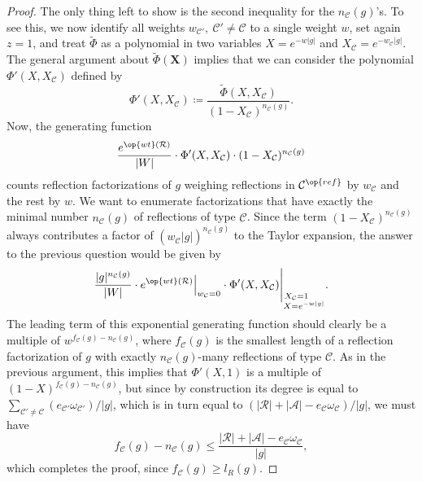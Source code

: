 \begin{proof}
The only thing left to show is the second inequality for the $n_{\mathcal{C}}(g)$'s. To see this, we now identify all weights $w_{\mathcal{C}'},\ \mathcal{C}'\neq\mathcal{C}$ to a single weight $w$, set again $z=1$, and treat $\tilde{\Phi}$ as a polynomial in two variables $X=e^{-w|g|}$ and $X_{\mathcal{C}}=e^{-w^{\phantom{l}}_{\mathcal{C}}|g|}$. The general argument about $\tilde{\Phi}(\bm X)$ implies that we can consider the polynomial $\Phi'(X,X_{\mathcal{C}})$ defined by $$\Phi'(X,X_{\mathcal{C}})\coloneqq \dfrac{\tilde{\Phi}(X,X_{\mathcal{C}})}{(1-X_{\mathcal{C}})^{n_{\mathcal{C}}(g)}}.$$
Now, the generating function $$\dfrac{e^{\op{wt}(\mathcal{R})}}{|W|}\cdot\Phi'(X,X_{\mathcal{C}})\cdot(1-X_{\mathcal{C}})^{n_{\mathcal{C}}(g)}$$ counts 
reflection factorizations of $g$ weighing reflections in $\mathcal{C}^{\op{ref}}$ by $w_{\mathcal{C}}$ and the rest by $w$. 
We want to enumerate factorizations that have exactly the minimal number $n_{\mathcal{C}}(g)$ of reflections of type $\mathcal{C}$. 
Since the term $(1-X_{\mathcal{C}})^{n_{\mathcal{C}}(g)}$ always contributes a factor of $(w^{\phantom{l}}_{\mathcal{C}}|g|)^{n_{\mathcal{C}}(g)}$ to the Taylor expansion, the answer to the previous question would be given by $$\dfrac{|g|^{n_{\mathcal{C}}(g)}}{|W|}\cdot e^{\op{wt}(\mathcal{R})}\Big|_{w_{\mathcal{C}}=0}\cdot\Phi'(X,X_{\mathcal{C}})\Bigg|_{\substack{X_{\mathcal{C}}=1\quad\ \\ X=e^{-w|g|}} }.$$
The leading term of this exponential generating function should clearly be a multiple of $w^{f_{\mathcal{C}}(g)-n_{\mathcal{C}}(g)}$, where $f_{\mathcal{C}}(g)$ is the smallest length of a reflection factorization of $g$ with exactly $n_{\mathcal{C}}(g)$-many reflections of type $\mathcal{C}$. As in the previous argument, this implies that $\Phi'(X,1)$ is a multiple of $(1-X)^{f_{\mathcal{C}}(g)-n_{\mathcal{C}}(g)}$, but since by construction its degree is equal to $\sum_{\mathcal{C}'\neq\mathcal{C}}(e_{\mathcal{C}'}\omega_{\mathcal{C}'})/|g|$, which is in turn equal to $\left(|\mathcal{R}|+|\mathcal{A}|-e_{\mathcal{C}}\omega_{\mathcal{C}}\right)/|g|$, we must have 
\[
f_{\mathcal{C}}(g)-n_{\mathcal{C}}(g)\leq \dfrac{|\mathcal{R}|+|\mathcal{A}|-e_{\mathcal{C}}\omega_{\mathcal{C}}}{|g|},
\]
 which completes the proof, since $f_{\mathcal{C}}(g)\geq l_R(g)$.
\end{proof}

